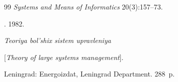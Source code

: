 {{\begin{thebibliography}{99}
\textit{Systems and Means of Informatics} 20(3):157--73.








 \label{end\stat}


 




. 1982. 


\textit{Teoriya bol'shix sistem upravleniya} 


[\textit{Theory of large systems management}].


Leningrad: Energoizdat, Leningrad  Department.  288~p.


  


 \end{thebibliography}


} }





\renewcommand{\bibname}{\protect\rmfamily Литература}


  


